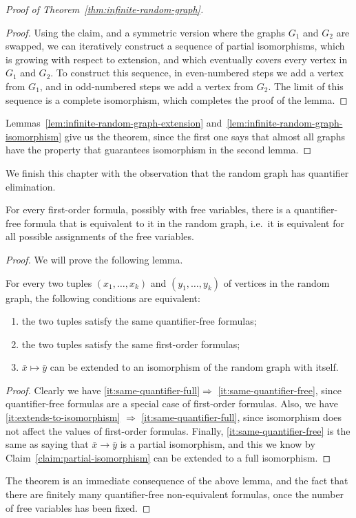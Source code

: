 \begin{proof}[Proof of Theorem~\ref{thm:infinite-random-graph}]
\begin{proof}
	Using the claim, and a symmetric version where the graphs $G_1$ and $G_2$ are swapped, we can iteratively construct a sequence of partial isomorphisms, which is growing with respect to extension, and which eventually covers every vertex in $G_1$ and $G_2$. To construct this sequence, in even-numbered steps we add a vertex from $G_1$, and in odd-numbered steps we add a vertex from $G_2$. The limit of this sequence is a complete isomorphism, which completes the proof of the lemma. 
\end{proof}
Lemmas~\ref{lem:infinite-random-graph-extension} and~\ref{lem:infinite-random-graph-isomorphism} give us the theorem, since the first one says that almost all graphs have the property that guarantees isomorphism in the second lemma.	
\end{proof}

We finish this chapter with the observation that the random graph has quantifier elimination.

\begin{theorem}\label{thm:quantifier-elimination}
	For every first-order formula, possibly with free variables, there is a quantifier-free formula that is equivalent to it in the random graph, i.e.~it is equivalent for all possible assignments of the free variables.
\end{theorem}
\begin{proof}
	We will prove the following lemma.
	
	\begin{lemma}
		For every two tuples $(x_1,\ldots,x_k)$ and $(y_1,\ldots,y_k)$ of vertices in the random graph, the following conditions are equivalent:
		\begin{enumerate}
			\item \label{it:same-quantifier-free} the two tuples satisfy the same quantifier-free formulas;
			\item \label{it:same-quantifier-full} the two tuples satisfy the same first-order formulas;
			\item \label{it:extends-to-isomorphism} $\bar x \mapsto \bar y$ can be extended to an isomorphism of the random graph with itself.
		\end{enumerate}
	\end{lemma}
	\begin{proof}
		Clearly we have \ref{it:same-quantifier-full}$\Rightarrow$ \ref{it:same-quantifier-free}, since quantifier-free formulas are a special case of first-order formulas. Also, we have \ref{it:extends-to-isomorphism} $\Rightarrow$ \ref{it:same-quantifier-full}, since isomorphism does not affect the values of first-order formulas. Finally, \ref{it:same-quantifier-free} is the same as saying that $\bar x \to \bar y$ is a partial isomorphism, and this we know by Claim~\ref{claim:partial-isomorphism} can be extended to a full isomorphism.
	\end{proof}
	The theorem is an immediate consequence of the above lemma, and the fact that there are finitely many quantifier-free non-equivalent formulas, once the number of free variables has been fixed. 
\end{proof}


